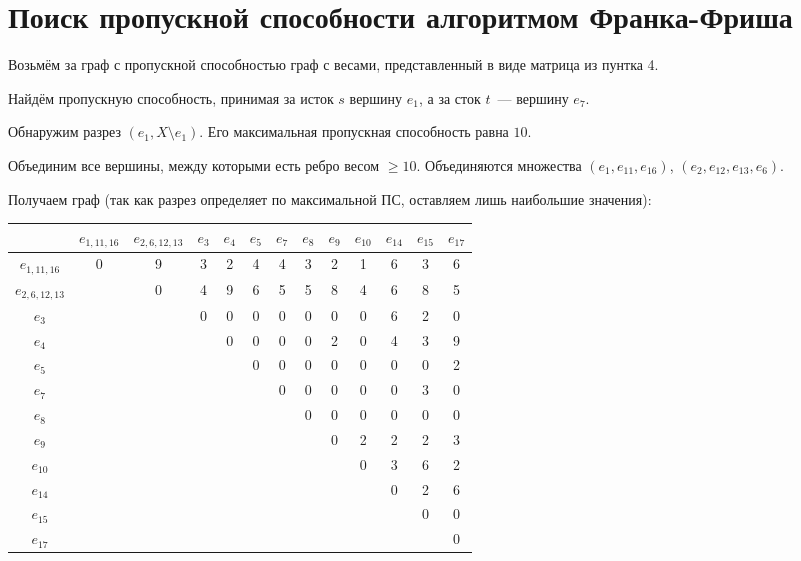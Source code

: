 \documentclass[12pt, a4paper] {ncc}
\begin{document}
\section{Поиск пропускной способности алгоритмом Франка-Фриша}

Возьмём за граф с пропускной способностью граф с весами, представленный в виде
матрица из пунтка 4.

Найдём пропускную способность, принимая за исток $s$ вершину $e_1$, а за сток
$t$~--- вершину $e_7$.

Обнаружим разрез $(e_1, X \setminus e_1)$. Его максимальная пропускная
способность равна $10$.

Объединим все вершины, между которыми есть ребро весом $\ge 10$. Объединяются
множества $(e_1, e_{11}, e_{16})$, $(e_2, e_{12}, e_{13}, e_{6})$.

Получаем граф (так как разрез определяет по максимальной ПС, оставляем лишь наибольшие значения):

\begin{tabular}{|c|c|c|c|c|c|c|c|c|c|c|c|c|}
\hline
 & $e_{1,11,16}$ & $e_{2,6,12,13}$ & $e_{3}$ & $e_{4}$ & $e_{5}$ & $e_{7}$ & $e_{8}$ & $e_{9}$ & $e_{10}$ & $e_{14}$ & $e_{15}$ & $e_{17}$ \\
\hline %
$e_{1,11,16}$  & 0 & 9 & 3 & 2 & 4 & 4 & 3 & 2 & 1 & 6 & 3 & 6 \\ \hline
$e_{2,6,12,13}$&   & 0 & 4 & 9 & 6 & 5 & 5 & 8 & 4 & 6 & 8 & 5 \\ \hline
$e_{3}$        &   &   & 0 & 0 & 0 & 0 & 0 & 0 & 0 & 6 & 2 & 0 \\ \hline
$e_{4}$        &   &   &   & 0 & 0 & 0 & 0 & 2 & 0 & 4 & 3 & 9 \\ \hline
$e_{5}$        &   &   &   &   & 0 & 0 & 0 & 0 & 0 & 0 & 0 & 2 \\ \hline
$e_{7}$        &   &   &   &   &   & 0 & 0 & 0 & 0 & 0 & 3 & 0 \\ \hline
$e_{8}$        &   &   &   &   &   &   & 0 & 0 & 0 & 0 & 0 & 0 \\ \hline
$e_{9}$        &   &   &   &   &   &   &   & 0 & 2 & 2 & 2 & 3 \\ \hline
$e_{10}$       &   &   &   &   &   &   &   &   & 0 & 3 & 6 & 2 \\ \hline
$e_{14}$       &   &   &   &   &   &   &   &   &   & 0 & 2 & 6 \\ \hline
$e_{15}$       &   &   &   &   &   &   &   &   &   &   & 0 & 0 \\ \hline
$e_{17}$       &   &   &   &   &   &   &   &   &   &   &   & 0 \\ \hline
\end{tabular}
\end{document}
